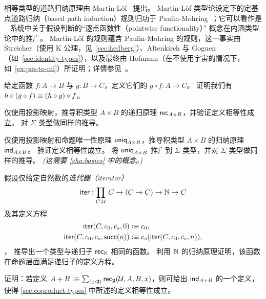 相等类型的道路归纳原理由 Martin-L\"{o}f~\cite{Martin-Lof-1973} 提出。
Martin-L\"of 类型论设定下的定基点道路归纳（based path induction）规则归功于 Paulin-Mohring~\cite{Moh93}；它可以看作是 \NuPRL~\cite[Section~8.1]{constable+86nuprl-book} 系统中关于假设判断的``逐点函数性（pointwise functionality）''
%
概念在内涵类型论中的推广。
Martin-L\"of 的规则蕴含 Paulin-Mohring 的规则，这一事实由 Streicher（使用 K 公理，见~\cref{sec:hedberg}）、Altenkirch 与 Goguen（如~\cref{sec:identity-types}），以及最终由 Hofmann（在不使用宇宙的情况下，如~\cref{ex:pm-to-ml}）所证明；详情参见~\cite[\S1.3 and Addendum]{Streicher93}。

\sectionExercises

\begin{ex}\label{ex:composition}
  给定函数 $f:A\to B$ 与 $g:B\to C$，定义它们的
  $g\circ f:A\to C$。
  证明我们有 $h \circ (g\circ f) \equiv (h\circ g)\circ f$。
\end{ex}

\begin{ex}\label{ex:pr-to-rec}
  仅使用投影映射，推导积类型 $A \times B$ 的递归原理 $\mathsf{rec}_{A\times B} $，并验证定义相等性成立。
  对 $\Sigma$ 类型做同样的推导。
\end{ex}

\begin{ex}\label{ex:pr-to-ind}
  仅使用投影映射和命题唯一性原理 $\mathsf{uniq}_{A\times B}$，推导积类型 $A \times B$ 的归纳原理 $\mathsf{ind}_{A\times B}$。
  验证定义相等性成立。
  将 $\mathsf{uniq}_{A\times B}$ 推广到 $\Sigma$ 类型，并对 $\Sigma$ 类型做同样的推导。
  \emph{(这需要 \cref{cha:basics} 中的概念。)}
\end{ex}

\begin{ex}\label{ex:iterator}
假设仅给定自然数的\emph{迭代器（iterator）}
\[\ite : \prd{C:\UU} C \to (C \to C) \to \nat \to C \]
及其定义方程
\begin{align*}
\mathsf{iter}(C,c_0,c_s,0)  &\vcentcolon\equiv c_0, \\
\mathsf{iter}(C,c_0,c_s,\mathsf{succ}(n)) &\vcentcolon\equiv c_s(\mathsf{iter}(C,c_0,c_s,n)),
\end{align*}，
推导出一个类型与递归子 $\mathsf{rec}_{\mathbb{N}}$ 相同的函数。
利用 $\mathbb{N}$ 的归纳原理证明，该函数在命题层面满足递归子的定义方程。
\end{ex}

\begin{ex}\label{ex:sum-via-bool}
%
证明：若定义 $A + B \defeq \sm{x:\bool} \rec{\bool}(\UU,A,B,x)$，则可给出 $\mathsf{ind}_{A+B}$ 的一个定义，使得 \cref{sec:coproduct-types} 中所述的定义相等性成立。
\end{ex}


